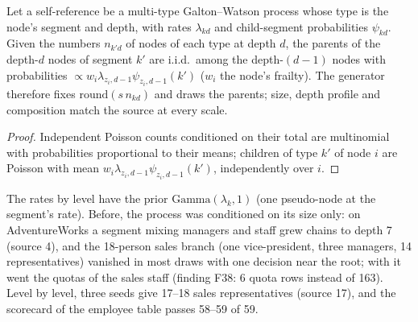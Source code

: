 \begin{proposition}\label{prop:treelevels}
Let a self-reference be a multi-type Galton--Watson process whose type is the node's segment and depth, with rates $\lambda_{kd}$ and child-segment probabilities $\psi_{kd}$. Given the numbers $n_{k'd}$ of nodes of each type at depth $d$, the parents of the depth-$d$ nodes of segment $k'$ are i.i.d.\ among the depth-$(d-1)$ nodes with probabilities $\propto w_i\lambda_{z_i,d-1}\psi_{z_i,d-1}(k')$ ($w_i$ the node's frailty). The generator therefore fixes $\mathrm{round}(s\,n_{kd})$ and draws the parents; size, depth profile and composition match the source at every scale.
\end{proposition}
\begin{proof}
Independent Poisson counts conditioned on their total are multinomial with probabilities proportional to their means; children of type $k'$ of node $i$ are Poisson with mean $w_i\lambda_{z_i,d-1}\psi_{z_i,d-1}(k')$, independently over $i$.
\end{proof}
\noindent The rates by level have the prior $\mathrm{Gamma}(\lambda_k,1)$ (one pseudo-node at the segment's rate). Before, the process was conditioned on its size only: on AdventureWorks a segment mixing managers and staff grew chains to depth 7 (source 4), and the 18-person sales branch (one vice-president, three managers, 14 representatives) vanished in most draws with one decision near the root; with it went the quotas of the sales staff (finding F38: 6 quota rows instead of 163). Level by level, three seeds give 17--18 sales representatives (source 17), and the scorecard of the employee table passes 58--59 of 59.
